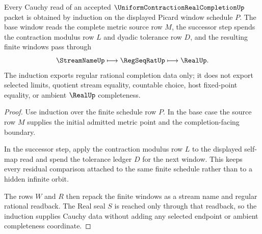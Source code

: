\begin{theorem}
\label{thm:uniform-contraction-real-completion-cauchy-induction}
Every Cauchy read of an accepted $\UniformContractionRealCompletionUp$ packet is obtained by induction on the displayed Picard window schedule $P$. The base window reads the complete metric source row $M$, the successor step spends the contraction modulus row $L$ and dyadic tolerance row $D$, and the resulting finite windows pass through
$$
\StreamNameUp \longmapsto \RegSeqRatUp \longmapsto \RealUp .
$$
The induction exports regular rational completion data only; it does not export selected limits, quotient stream equality, countable choice, host fixed-point equality, or ambient $\RealUp$ completeness.
\end{theorem}
\begin{proof}
Use induction over the finite schedule row $P$. In the base case the source row $M$ supplies the initial admitted metric point and the completion-facing boundary.

In the successor step, apply the contraction modulus row $L$ to the displayed self-map read and spend the tolerance ledger $D$ for the next window. This keeps every residual comparison attached to the same finite schedule rather than to a hidden infinite orbit.

The rows $W$ and $R$ then repack the finite windows as a stream name and regular rational readback. The Real seal $S$ is reached only through that readback, so the induction supplies Cauchy data without adding any selected endpoint or ambient completeness coordinate.
\end{proof}

